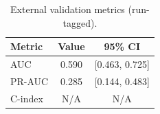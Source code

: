 \begin{table}[t]
\centering
\caption{External validation metrics (run-tagged).}
\label{tab:external_validation_PPMI_20250930_PRELIM}
\begin{tabular}{lcc}
\toprule
Metric & Value & 95\% CI \\
\midrule
AUC & 0.590 & [0.463, 0.725] \\
PR-AUC & 0.285 & [0.144, 0.483] \\
C-index & N/A & N/A \\
\bottomrule
\end{tabular}
\end{table}
